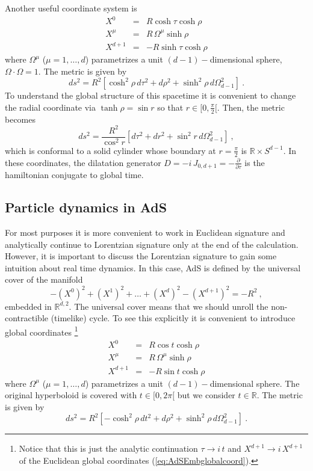 \documentclass{ws-rv9x6}
\newcommand\be{\begin{equation}}
\newcommand\ee{\end{equation}}
\begin{document}
Another useful coordinate system is 
\begin{eqnarray}
X^{0} & = & R\cosh\tau\cosh\rho\nonumber \\
X^{\mu} & = & R\,\Omega^{\mu}\sinh\rho\label{eq:AdSEmbglobalcoord}\\
X^{d+1} & = & -R\sinh\tau\cosh\rho\nonumber 
\end{eqnarray}
where $\Omega^{\mu}$ ($\mu=1,\dots,d$) parametrizes a unit $(d-1)-$dimensional
sphere, $\Omega\cdot\Omega=1$. The metric is given by
\be
ds^{2}=R^{2}\left[\cosh^{2}\rho\, d\tau^{2}+d\rho^{2}+\sinh^{2}\rho\, d\Omega_{d-1}^{2}\right]\ .
\ee
To understand the global structure of this spacetime it is convenient
to change the radial coordinate via $\tanh\rho=\sin r$ so that $r\in[0,\frac{\pi}{2}[$.
Then, the metric becomes
\begin{equation}
ds^{2}=\frac{R^{2}}{\cos^{2}r}\left[d\tau^{2}+dr^{2}+\sin^{2}r\, d\Omega_{d-1}^{2}\right]\ ,\label{eq:EAdSglobalcompactcoord}
\end{equation}
which is conformal to a solid cylinder whose boundary at $r=\frac{\pi}{2}$
is $\mathbb{R}\times S^{d-1}$. In these coordinates, the dilatation
generator $D=-i\, J_{0,d+1}=-\frac{\partial}{\partial\tau}$ is the
hamiltonian conjugate to global time. 


\subsection{Particle dynamics in AdS}

For most purposes it is more convenient to work in Euclidean signature
and analytically continue to Lorentzian signature only at the end
of the calculation. However, it is important to discuss the Lorentzian
signature to gain some intuition about real time dynamics. In this
case, AdS is defined by the universal cover of the manifold
\begin{equation}
-\left(X^{0}\right)^{2}+\left(X^{1}\right)^{2}+\dots+\left(X^{d}\right)^{2}-\left(X^{d+1}\right)^{2}=-R^{2}\ ,\label{eq:EmbeddingLorentzianAdS}
\end{equation}
embedded in $\mathbb{R}^{d,2}$. The universal cover means that we
should unroll the non-contractible (timelike) cycle. To see this explicitly
it is convenient to introduce global coordinates%
\footnote{Notice that this is just the analytic continuation $\tau\to i\, t$
and $X^{d+1}\to i\, X^{d+1}$ of the Euclidean global coordinates
(\ref{eq:AdSEmbglobalcoord}).%
}
\begin{eqnarray}
X^{0} & = & R\cos t\cosh\rho \nonumber\\
X^{\mu} & = & R\,\Omega^{\mu}\sinh\rho\\
X^{d+1} & = & -R\sin t\cosh\rho \nonumber
\end{eqnarray}
where $\Omega^{\mu}$ ($\mu=1,\dots,d$) parametrizes a unit $(d-1)-$dimensional
sphere. The original hyperboloid is covered with $t\in[0,2\pi[$ but
we consider $t\in\mathbb{R}$. The metric is given by
\begin{equation}
ds^{2}=R^{2}\left[-\cosh^{2}\rho\, dt^{2}+d\rho^{2}+\sinh^{2}\rho\, d\Omega_{d-1}^{2}\right]\ .\label{eq:globalcoordLorentzian}
\end{equation}
\end{document}
